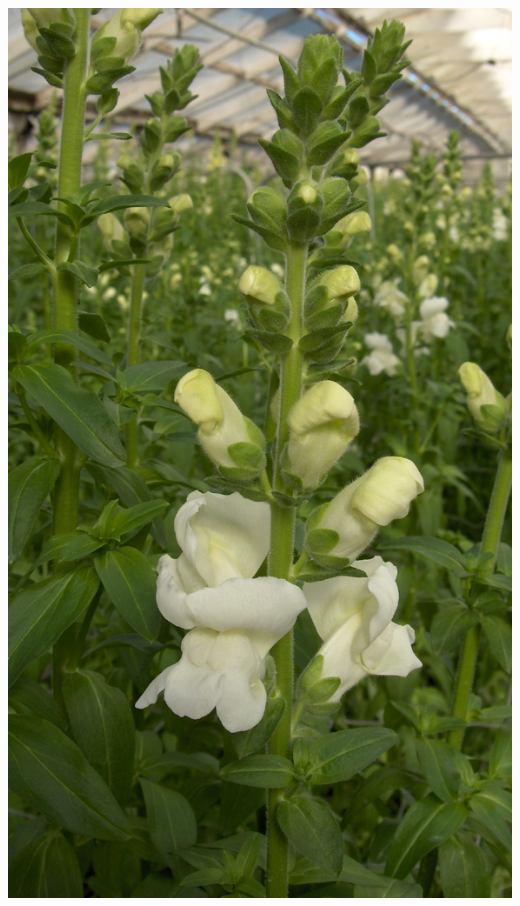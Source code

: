 \documentclass{article}
\begin{document}
\begin{center}
\includegraphics[width=0.9\textheight, angle=90]{../Snapdragon.jpg}
\end{center}
\newpage
\end{document}
